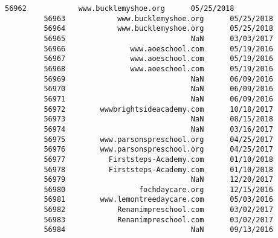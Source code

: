 \documentclass[11pt]{article}
\begin{document}
\begin{Verbatim}[commandchars=\\\{\}]
         56962            www.bucklemyshoe.org      05/25/2018   
         56963            www.bucklemyshoe.org      05/25/2018   
         56964            www.bucklemyshoe.org      05/25/2018   
         56965                             NaN      03/03/2017   
         56966               www.aoeschool.com      05/19/2016   
         56967               www.aoeschool.com      05/19/2016   
         56968               www.aoeschool.com      05/19/2016   
         56969                             NaN      06/09/2016   
         56970                             NaN      06/09/2016   
         56971                             NaN      06/09/2016   
         56972        wwwbrightsideacademy.com      10/18/2017   
         56973                             NaN      08/15/2018   
         56974                             NaN      03/16/2017   
         56975        www.parsonspreschool.org      04/25/2017   
         56976        www.parsonspreschool.org      04/25/2017   
         56977          Firststeps-Academy.com      01/10/2018   
         56978          Firststeps-Academy.com      01/10/2018   
         56979                             NaN      12/20/2017   
         56980                 fochdaycare.org      12/15/2016   
         56981        www.lemontreedaycare.com      05/03/2016   
         56982            Renanimpreschool.com      03/02/2017   
         56983            Renanimpreschool.com      03/02/2017   
         56984                             NaN      09/13/2016   
         

\end{Verbatim}
\end{document}
